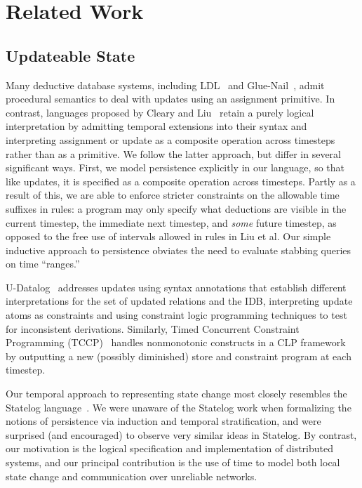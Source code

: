 \section{Related Work}

\subsection{Updateable State}

Many deductive database systems, including LDL~\cite{ldl} and Glue-Nail~\cite{glue-nail}, admit procedural semantics to deal with updates using an
assignment primitive.  In contrast, languages proposed by Cleary and Liu~\cite{harmful,deductiveupdates,starlog} retain a purely logical 
interpretation by admitting temporal extensions into their syntax and interpreting assignment or update as a composite operation
across timesteps~\cite{deductiveupdates} rather than as a primitive.  We follow the latter approach, but differ in several significant ways.
First, we model persistence explicitly in our language, so that like updates, it is specified as a composite operation across timesteps.
Partly as a result of this, we are able to enforce stricter constraints on the allowable time suffixes in rules: a program may only specify what deductions are visible
in the current timestep, the immediate next timestep, and \emph{some} future timestep, as opposed to the free use of intervals allowed in rules in Liu et al.  Our simple inductive approach to persistence obviates the need to evaluate stabbing queries on time ``ranges.''

U-Datalog~\cite{udatalog-neg} addresses updates using syntax annotations that establish different interpretations for the set of updated 
relations and the IDB, interpreting update atoms as constraints and using constraint logic programming techniques to test for inconsistent
derivations.  Similarly, Timed Concurrent Constraint Programming (TCCP)~\cite{tdccp,tccp} handles nonmonotonic constructs in a CLP framework
by outputting a new (possibly diminished) store and constraint program at each timestep.  

Our temporal approach to representing state change most closely resembles the
Statelog language~\cite{statelog}.  We were unaware of the Statelog work when formalizing the 
notions of persistence via induction and temporal stratification, and were surprised
(and encouraged) to observe very similar ideas in Statelog.  By contrast, our motivation is
the logical specification and implementation of distributed systems, and our 
principal contribution is the use of time to model both local state change and communication
over unreliable networks.

